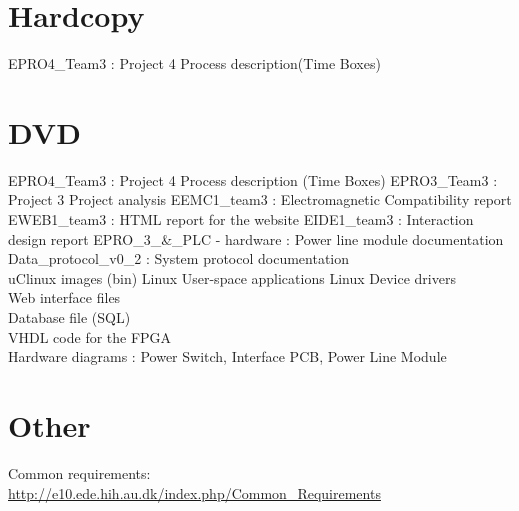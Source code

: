 %
\section{Hardcopy}
EPRO4\_Team3 : Project 4 Process description(Time Boxes)
\section{DVD}
EPRO4\_Team3 : Project 4 Process description (Time Boxes)
\p EPRO3\_Team3 : Project 3 Project analysis
\p EEMC1\_team3 : Electromagnetic Compatibility report
\p EWEB1\_team3 : HTML report for the website
\p EIDE1\_team3 : Interaction design report
\p EPRO\_3\_\&\_PLC - hardware : Power line module documentation
\p Data\_protocol\_v0\_2 : System protocol documentation
\\\p uClinux images (bin)
\p Linux User-space applications
\p Linux Device drivers
\\\p Web interface files 
\\\p Database file (SQL)
\\\p VHDL code for the FPGA
\\\p Hardware diagrams : Power Switch, Interface PCB, Power Line Module

\section{Other}
Common requirements: \url{http://e10.ede.hih.au.dk/index.php/Common_Requirements}